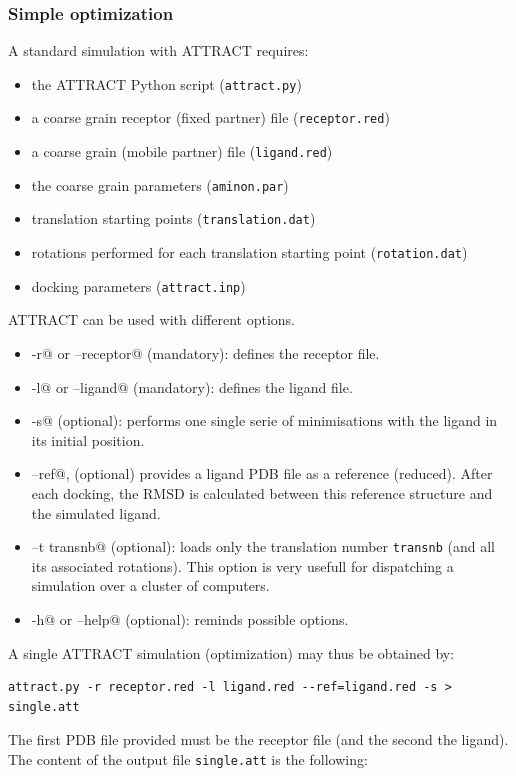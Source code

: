\documentclass[12pt,a4paper]{article}
\begin{document}
\subsubsection{Simple optimization}

A standard simulation with ATTRACT requires:
\begin{itemize}
\item the ATTRACT Python script ({\tt  attract.py})
\item a coarse grain receptor (fixed partner) file ({\tt receptor.red})
\item a coarse grain (mobile partner) file ({\tt ligand.red})
\item the coarse grain parameters ({\tt aminon.par})
\item translation starting points ({\tt translation.dat})
\item rotations performed for each translation starting point ({\tt rotation.dat})
\item docking parameters ({\tt attract.inp})
\end{itemize}

ATTRACT can be used with different options.
\begin{itemize}
\item \verb@-r@ or \verb@--receptor@ (mandatory): defines the receptor file.
\item \verb@-l@ or \verb@--ligand@ (mandatory): defines the ligand file.
\item \verb@ -s@ (optional): performs one single serie of minimisations with the ligand in its initial position.
\item \verb@--ref@, (optional) provides a ligand PDB file as a reference (reduced). After each docking, the RMSD is calculated between this reference structure and the simulated ligand.
\item \verb@--t transnb@ (optional): loads only the translation number {\tt transnb} (and all its associated rotations). This option is very usefull for dispatching a simulation over a cluster of computers.
\item \verb@-h@ or \verb@--help@ (optional): reminds possible options.
\end{itemize}


A single ATTRACT simulation (optimization) may thus be obtained by:
\begin{verbatim}
attract.py -r receptor.red -l ligand.red --ref=ligand.red -s > single.att
\end{verbatim}

The first PDB file provided must be the receptor file (and the second the ligand).
The content of the output file {\tt single.att} is the following:
\end{document}
